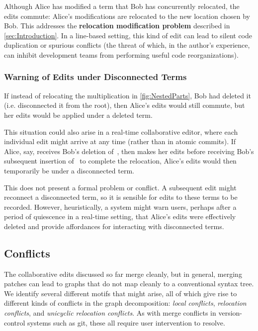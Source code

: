 Although Alice has modified a term that Bob has concurrently relocated, the edits commute: Alice's modifications are relocated to the new location chosen by Bob.
This addresses the \textbf{relocation modification problem} described in \autoref{sec:Introduction}.
In a line-based setting, this kind of edit can lead to silent code duplication or spurious conflicts (the threat of which, in the author's experience, can inhibit development teams from performing useful code reorganizations).


\subsubsection{Warning of Edits under Disconnected Terms}

If instead of relocating the multiplication in \autoref{fig:NestedParts}, Bob had deleted it (i.e. disconnected it from the root), then Alice's edits would still commute, but her edits would be applied under a deleted term. 

This situation could also arise in a real-time collaborative editor, where each individual edit might arrive at any time (rather than in atomic commits). If Alice, say, receives Bob's deletion of~\eMoveTimes{}, then makes her edits 
before receiving Bob's subsequent insertion of~\eNestedPartsBob{} to complete the relocation, 
Alice's edits would then temporarily be under a disconnected term. 

This does not present a formal problem or conflict. A subsequent edit might reconnect a disconnected term, so it is sensible for edits to these terms to be recorded. 
However, heuristically, a system might warn users, perhaps after a period of quiescence in a real-time setting, that Alice's edits were effectively deleted and provide affordances for interacting with disconnected terms.

\subsection{Conflicts}%
\label{sub:Merge Conflicts}

The collaborative edits discussed so far merge cleanly,
but in general, merging patches can lead to graphs that do not map cleanly to a conventional syntax tree. We identify several different motifs that might arise, all of which give rise to different kinds of conflicts in the graph decomposition: \emph{local conflicts}, \emph{relocation conflicts}, and \emph{unicyclic relocation conflicts}. 
As with merge conflicts in version-control systems such as git, these all require user intervention to resolve. 

